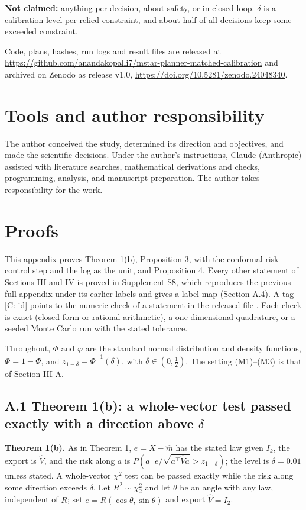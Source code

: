 \documentclass{ieeeaccess}
\begin{document}
\textbf{Not claimed:} anything per decision, about safety, or in closed loop. $\delta$ is a calibration level per relied constraint, and about half of all decisions keep some exceeded constraint.

Code, plans, hashes, run logs and result files are released at \url{https://github.com/anandakopalli7/mstar-planner-matched-calibration} and archived on Zenodo as release v1.0, \url{https://doi.org/10.5281/zenodo.24048340}.

\section*{Tools and author responsibility}
The author conceived the study, determined its direction and objectives, and made the scientific decisions. Under the author's instructions, Claude (Anthropic) assisted with literature searches, mathematical derivations and checks, programming, analysis, and manuscript preparation. The author takes responsibility for the work.

\appendices
\section{\break Proofs}
This appendix proves Theorem 1(b), Proposition 3, with the conformal-risk-control step and the log as the unit, and Proposition 4. Every other statement of Sections III and IV is proved in Supplement S8, which reproduces the previous full appendix under its earlier labels and gives a label map (Section A.4). A tag [C: id] points to the numeric check of a statement in the released file . Each check is exact (closed form or rational arithmetic), a one-dimensional quadrature, or a seeded Monte Carlo run with the stated tolerance.

Throughout, $\Phi$ and $\varphi$ are the standard normal distribution and density functions, $\bar{\Phi} = 1 - \Phi$, and $z_{1-\delta} = \bar{\Phi}^{-1}(\delta)$, with $\delta \in (0, \tfrac{1}{2})$. The setting (M1)--(M3) is that of Section III-A.

\subsection*{A.1 Theorem 1(b): a whole-vector test passed exactly with a direction above $\delta$}
\textbf{Theorem 1(b).} As in Theorem 1, $e = X - \hat{m}$ has the stated law given $I_{k}$, the export is $\hat{V}$, and the risk along $a$ is $P(a^{\top}e/\sqrt{a^{\top}\hat{V}a} > z_{1-\delta})$; the level is $\delta = 0.01$ unless stated. A whole-vector $\chi^{2}$ test can be passed exactly while the risk along some direction exceeds $\delta$. Let $R^{2} \sim \chi_{2}^{2}$ and let $\theta$ be an angle with any law, independent of $R$; set $e = R(\cos \theta, \sin \theta)$ and export $\hat{V} = I_{2}$.
\end{document}
